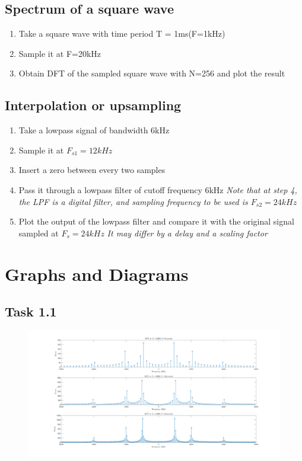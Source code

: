 \documentclass{article}
\begin{document}
\subsection{Spectrum of a square wave}
\begin{enumerate}
  \item Take a square wave with time period T = 1ms(F=1kHz)
  \item Sample it at F=20kHz
  \item Obtain DFT of the sampled square wave with N=256 and plot the result
\end{enumerate}

\subsection{Interpolation or upsampling}
\begin{enumerate}
  \item Take a lowpass signal of bandwidth 6kHz
  \item Sample it at $F_{s1}=12kHz$
  \item Insert a zero between every two samples
  \item Pass it through a lowpass filter of cutoff frequency 6kHz
    \emph{Note that at step 4, the LPF is a digital filter, and sampling frequency to be used is $F_{s2}=24kHz$}
  \item Plot the output of the lowpass filter and compare it with the original signal sampled at $F_s=24kHz$
    \emph{It may differ by a delay and a scaling factor}
\end{enumerate}
\newpage
\section{Graphs and Diagrams}
\subsection{Task 1.1}
\begin{figure}[!ht]
    \includegraphics[width=\textwidth]{Ass1a.png}
\end{figure}
\newpage
\end{document}
